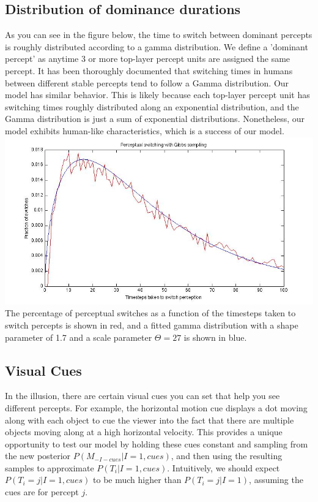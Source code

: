 \documentclass{article} %
\begin{document}


\subsection{Distribution of dominance durations}
As you can see in the figure below, the time to switch between dominant percepts is roughly distributed according to a gamma distribution. We define a 'dominant percept' as anytime 3 or more top-layer percept units are assigned the same percept. It has been thoroughly documented that switching times in humans between different stable percepts tend to follow a Gamma distribution. Our model has similar behavior. This is likely because each top-layer percept unit has switching times roughly distributed along an exponential distribution, and the Gamma distribution is just a sum of exponential distributions. Nonetheless, our model exhibits human-like characteristics, which is a success of our model. \\

\includegraphics[scale=0.51]{sickbrah}
\small
The percentage of perceptual switches as a function of the timesteps taken to switch percepts is shown in red, and a fitted gamma distribution with a shape parameter of 1.7 and a scale parameter $\Theta = 27$ is shown in blue.
\normalsize


\subsection{Visual Cues}
In the illusion, there are certain visual cues you can set that help you see different percepts. For example, the horizontal motion cue displays a dot moving along with each object to cue the viewer into the fact that there are multiple objects moving along at a high horizontal velocity. This provides a unique opportunity to test our model by holding these cues constant and sampling from the new posterior $P(M_{-I-cues}|I=1, cues)$, and then using the resulting samples to approximate $P(T_i|I=1, cues)$. Intuitively, we should expect $P(T_i = j|I=1, cues)$ to be much higher than $P(T_i = j|I=1)$, assuming the cues are for percept $j$. 
\end{document}
